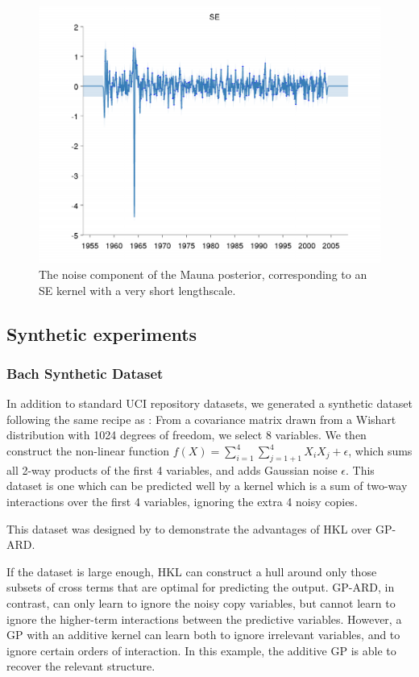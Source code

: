 \documentclass[twoside]{article}
\begin{document}
\begin{figure}
\includegraphics[width=\columnwidth]{../figures/decomposition/mauna_test_4}
\caption{The noise component of the Mauna posterior, corresponding to an SE kernel with a very short lengthscale.}
\label{fig:mauna_decomp4}
\end{figure}




\subsection{Synthetic experiments}

\subsubsection{Bach Synthetic Dataset}
In addition to standard UCI repository datasets, we generated a synthetic dataset following the same recipe as \cite{DBLP:journals/corr/abs-0909-0844}: From a covariance matrix drawn from a Wishart distribution with 1024 degrees of freedom, we select 8 variables.  We then construct the non-linear function $f(X) = \sum_{i=1}^4 \sum_{j=1+1}^4 X_i X_j + \epsilon$, which sums all 2-way products of the first 4 variables, and adds Gaussian noise $\epsilon$.  This dataset is one which can be predicted well by a kernel which is a sum of two-way interactions over the first 4 variables, ignoring the extra 4 noisy copies.

This dataset was designed by \cite{DBLP:journals/corr/abs-0909-0844} to demonstrate the advantages of HKL over GP-ARD. 

If the dataset is large enough, HKL can construct a hull around only those subsets of cross terms that are optimal for predicting the output.  GP-ARD, in contrast, can only learn to ignore the noisy copy variables, but cannot learn to ignore the higher-term interactions between the predictive variables.  However, a GP with an additive kernel can learn both to ignore irrelevant variables, and to ignore certain orders of interaction.  In this example, the additive GP is able to recover the relevant structure.
\end{document}
